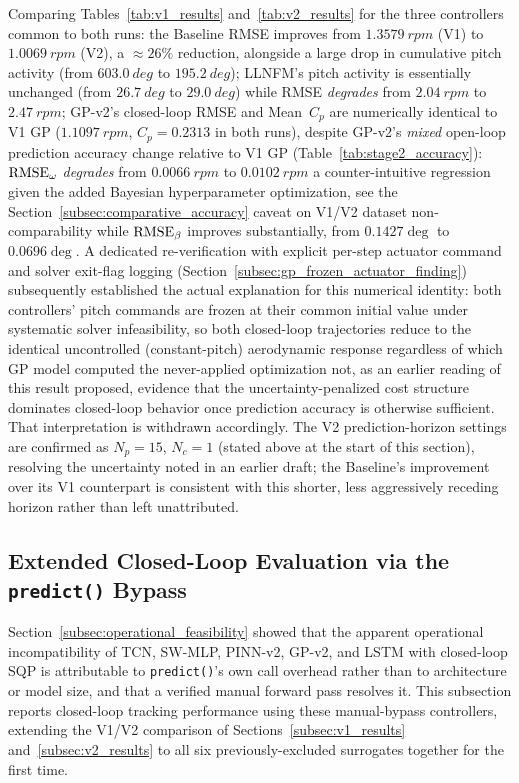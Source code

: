 Comparing Tables~\ref{tab:v1_results} and~\ref{tab:v2_results} for the
three controllers common to both runs: the Baseline RMSE improves from
$\SI{1.3579}{rpm}$ (V1) to $\SI{1.0069}{rpm}$ (V2), a $\approx 26\%$
reduction, alongside a large drop in cumulative pitch activity (from
$\SI{603.0}{deg}$ to $\SI{195.2}{deg}$); LLNFM's pitch activity is
essentially unchanged (from $\SI{26.7}{deg}$ to $\SI{29.0}{deg}$) while
RMSE \emph{degrades} from $\SI{2.04}{rpm}$ to
$\SI{2.47}{rpm}$; GP-v2's closed-loop RMSE and Mean~$C_p$ are numerically
identical to V1 GP ($\SI{1.1097}{rpm}$, $C_p=0.2313$ in both runs), despite
GP-v2's \emph{mixed} open-loop prediction accuracy change relative to
V1 GP (Table~\ref{tab:stage2_accuracy}): $\text{RMSE}_\omega$ \emph{degrades}
from $\SI{0.0066}{rpm}$ to $\SI{0.0102}{rpm}$ a counter-intuitive
regression given the added Bayesian hyperparameter optimization, see the
Section~\ref{subsec:comparative_accuracy} caveat on V1/V2 dataset
non-comparability while $\text{RMSE}_\beta$ improves substantially, from
$0.1427\deg$ to $0.0696\deg$. A dedicated re-verification with explicit
per-step actuator command and solver exit-flag logging
(Section~\ref{subsec:gp_frozen_actuator_finding}) subsequently
established the actual explanation for this numerical identity: both
controllers' pitch commands are frozen at their common initial value
under systematic solver infeasibility, so both closed-loop trajectories
reduce to the identical uncontrolled (constant-pitch) aerodynamic
response regardless of which GP model computed the never-applied
optimization  not, as an earlier reading of this result proposed,
evidence that the uncertainty-penalized cost structure dominates
closed-loop behavior once prediction accuracy is otherwise sufficient.
That interpretation is withdrawn accordingly. The V2 prediction-horizon
settings are confirmed as $N_p=15$, $N_c=1$ (stated above at the start of
this section), resolving the uncertainty noted in an earlier draft; the
Baseline's improvement over its V1 counterpart is consistent with this
shorter, less aggressively receding horizon rather than left unattributed.

\subsection{Extended Closed-Loop Evaluation via the \texttt{predict()} Bypass}
\label{subsec:bypass_closed_loop}

Section~\ref{subsec:operational_feasibility} showed that the apparent
operational incompatibility of TCN, SW-MLP, PINN-v2, GP-v2, and LSTM
with closed-loop SQP is attributable to \texttt{predict()}'s own call
overhead rather than to architecture or model size, and that a verified
manual forward pass resolves it. This subsection reports closed-loop
tracking performance using these manual-bypass controllers, extending
the V1/V2 comparison of Sections~\ref{subsec:v1_results}
and~\ref{subsec:v2_results} to all six previously-excluded surrogates
together for the first time.

